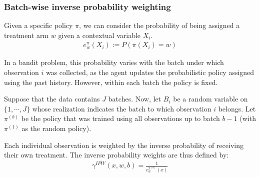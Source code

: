 \documentclass[letterpaper, 12pt, parskip=full, headsepline]{scrartcl}
\begin{document}
\subsubsection{Batch-wise inverse probability weighting} \label{appendix:probability}
Given a specific policy $\pi$, we can consider the probability of being assigned a treatment arm $w$ given a contextual variable $X_{i}$.
\begin{align}
e^{\pi}_{w}(X_i) := P(\pi(X_i) = w )
\label{eq:weighted_optimization}
\end{align}

In a bandit problem, this probability varies with the batch under which observation $i$ was collected, as the agent updates the probabilistic policy assigned using the past history. However, within each batch the policy is fixed. %

Suppose that the data contains $J$ batches. Now, let $B_{i}$ be a random variable on $\{1,\cdots, J\}$ whose realization indicates the batch to which observation $i$ belongs. Let $\pi^{(b)}$ be the policy that was trained using all observations up to batch $b-1$ (with $\pi^{(1)}$ as the random policy).




Each individual observation is weighted by the inverse probability of receiving their own treatment. The inverse probability weights are thus defined by:
\begin{align}
\gamma^{IPW}(x, w, b) = \frac{1}{e_{w}^{\pi^{(b)}}(x)}
\end{align}
\end{document}
